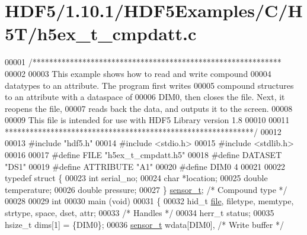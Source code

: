 \hypertarget{_h_d_f5_21_810_81_2_h_d_f5_examples_2_c_2_h5_t_2h5ex__t__cmpdatt_8c_source}{}\section{H\+D\+F5/1.10.1/\+H\+D\+F5\+Examples/\+C/\+H5\+T/h5ex\+\_\+t\+\_\+cmpdatt.c}
\label{_h_d_f5_21_810_81_2_h_d_f5_examples_2_c_2_h5_t_2h5ex__t__cmpdatt_8c_source}

\begin{DoxyCode}
00001 \textcolor{comment}{/************************************************************}
00002 \textcolor{comment}{}
00003 \textcolor{comment}{  This example shows how to read and write compound}
00004 \textcolor{comment}{  datatypes to an attribute.  The program first writes}
00005 \textcolor{comment}{  compound structures to an attribute with a dataspace of}
00006 \textcolor{comment}{  DIM0, then closes the file.  Next, it reopens the file,}
00007 \textcolor{comment}{  reads back the data, and outputs it to the screen.}
00008 \textcolor{comment}{}
00009 \textcolor{comment}{  This file is intended for use with HDF5 Library version 1.8}
00010 \textcolor{comment}{}
00011 \textcolor{comment}{ ************************************************************/}
00012 
00013 \textcolor{preprocessor}{#include "hdf5.h"}
00014 \textcolor{preprocessor}{#include <stdio.h>}
00015 \textcolor{preprocessor}{#include <stdlib.h>}
00016 
00017 \textcolor{preprocessor}{#define FILE            "h5ex\_t\_cmpdatt.h5"}
00018 \textcolor{preprocessor}{#define DATASET         "DS1"}
00019 \textcolor{preprocessor}{#define ATTRIBUTE       "A1"}
00020 \textcolor{preprocessor}{#define DIM0            4}
00021 
00022 \textcolor{keyword}{typedef} \textcolor{keyword}{struct }\{
00023     \textcolor{keywordtype}{int}     serial\_no;
00024     \textcolor{keywordtype}{char}    *location;
00025     \textcolor{keywordtype}{double}  temperature;
00026     \textcolor{keywordtype}{double}  pressure;
00027 \} \hyperlink{structsensor__t}{sensor\_t};                                 \textcolor{comment}{/* Compound type */}
00028 
00029 \textcolor{keywordtype}{int}
00030 main (\textcolor{keywordtype}{void})
00031 \{
00032     hid\_t       \hyperlink{structfile}{file}, filetype, memtype, strtype, space, dset, attr;
00033                                             \textcolor{comment}{/* Handles */}
00034     herr\_t      status;
00035     hsize\_t     dims[1] = \{DIM0\};
00036     \hyperlink{structsensor__t}{sensor\_t}    wdata[DIM0],                \textcolor{comment}{/* Write buffer */}

\end{DoxyCode}
